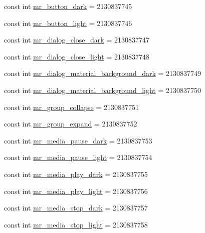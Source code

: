 \begin{CompactItemize}
const int \hyperlink{class__2doo_1_1_droid_1_1_resource_1_1_drawable_1889870275a9ac7c053b0e2495b8ba09}{mr\_\-button\_\-dark} = 2130837745
\item 
const int \hyperlink{class__2doo_1_1_droid_1_1_resource_1_1_drawable_aece5a60f60edc232ca56582f2f6a640}{mr\_\-button\_\-light} = 2130837746
\item 
const int \hyperlink{class__2doo_1_1_droid_1_1_resource_1_1_drawable_56098ca40b06bed0229a821a8dea55db}{mr\_\-dialog\_\-close\_\-dark} = 2130837747
\item 
const int \hyperlink{class__2doo_1_1_droid_1_1_resource_1_1_drawable_2adf42664feeab4cd218c972043f3d0b}{mr\_\-dialog\_\-close\_\-light} = 2130837748
\item 
const int \hyperlink{class__2doo_1_1_droid_1_1_resource_1_1_drawable_7ba48c7f4ed66571f264852b7159b573}{mr\_\-dialog\_\-material\_\-background\_\-dark} = 2130837749
\item 
const int \hyperlink{class__2doo_1_1_droid_1_1_resource_1_1_drawable_0d4d86d498f5066bfe0bc2dbc11d75b1}{mr\_\-dialog\_\-material\_\-background\_\-light} = 2130837750
\item 
const int \hyperlink{class__2doo_1_1_droid_1_1_resource_1_1_drawable_2d2eafea90d563868a630ba2aeccffaf}{mr\_\-group\_\-collapse} = 2130837751
\item 
const int \hyperlink{class__2doo_1_1_droid_1_1_resource_1_1_drawable_f4a1f5d99597895a4a03bf7b4ea88208}{mr\_\-group\_\-expand} = 2130837752
\item 
const int \hyperlink{class__2doo_1_1_droid_1_1_resource_1_1_drawable_b56b11deabe64ba220c09aa24d81a68b}{mr\_\-media\_\-pause\_\-dark} = 2130837753
\item 
const int \hyperlink{class__2doo_1_1_droid_1_1_resource_1_1_drawable_a30364b71d8fe7f5ffcbe8c532ba047d}{mr\_\-media\_\-pause\_\-light} = 2130837754
\item 
const int \hyperlink{class__2doo_1_1_droid_1_1_resource_1_1_drawable_2e2e9796ac5bdac4e3748f9992425392}{mr\_\-media\_\-play\_\-dark} = 2130837755
\item 
const int \hyperlink{class__2doo_1_1_droid_1_1_resource_1_1_drawable_8568230ecaa349c3b0dea1a9918730cb}{mr\_\-media\_\-play\_\-light} = 2130837756
\item 
const int \hyperlink{class__2doo_1_1_droid_1_1_resource_1_1_drawable_1f88e9abc39c78574e879e8b57ee936d}{mr\_\-media\_\-stop\_\-dark} = 2130837757
\item 
const int \hyperlink{class__2doo_1_1_droid_1_1_resource_1_1_drawable_2bc89455191f568eda955003a42aae36}{mr\_\-media\_\-stop\_\-light} = 2130837758

\end{CompactItemize}
